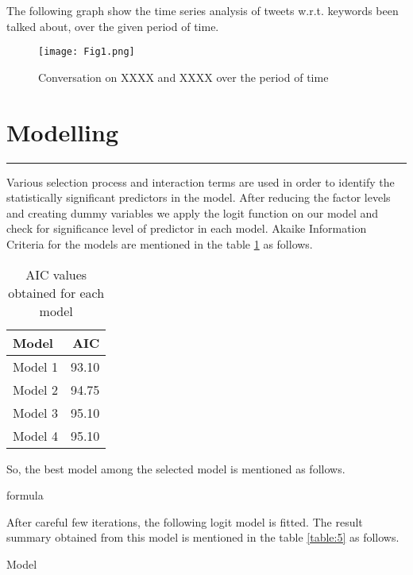 \documentclass[a4paper,12pt, notitlepage]{article}
\begin{document}
\par
The following graph show the time series analysis of tweets w.r.t. keywords been talked about, over the given period of time.

\begin{figure}[!htbp]
    \centering
    \texttt{[image: Fig1.png]}
    \caption{Conversation on XXXX and XXXX over the period of time}
    \label{fig:timeseries1}
\end{figure}

\section{Modelling}
\rule{\textwidth}{0.5pt}
\par
Various selection process and interaction terms are used in order to identify the statistically significant predictors in the model. After reducing the factor levels and creating dummy variables we apply the logit function on our model and check for significance level of predictor in each model. Akaike Information Criteria for the models are mentioned in the table \ref{table:4} as follows.

\begin{table}[!htbp]
\centering
\begin{tabular}{ |l|r| } 
\hline \rowcolor{Gray}
Model & AIC   \\
\hline
Model 1 & 93.10  \\ 
Model 2 & 94.75  \\ 
Model 3 & 95.10  \\ 
Model 4 & 95.10  \\ 
\hline
\end{tabular}
\caption{AIC	values	obtained	for	each	model}
\label{table:4}
\end{table}

\par
So, the best model among the selected model is mentioned as follows.

\begin{mdframed}[hidealllines=true,backgroundcolor=gray!20]
formula 
\end{mdframed}

\par
After careful few iterations, the following logit model is fitted. The result summary obtained from this model is mentioned in the table \ref{table:5} as follows.

\begin{mdframed}[hidealllines=true,backgroundcolor=gray!20]
Model
\end{mdframed}
\end{document}
